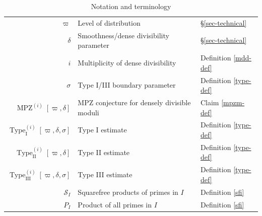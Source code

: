 \documentclass[12pt,a4paper,reqno]{amsart}
\numberwithin{equation}{section}
\DeclareMathOperator*\EH{EH}
\DeclareMathOperator*\MPZ{MPZ}
\DeclareMathOperator*\DHL{DHL}
\theoremstyle{plain}
\theoremstyle{definition}
\newcommand\B{\operatorname{B}}
\newcommand\Scal{\mathcal{S}}
\newcommand\TypeI{\operatorname{Type}_{\operatorname{I}}}
\newcommand\TypeII{\operatorname{Type}_{\operatorname{II}}}
\newcommand\TypeIII{\operatorname{Type}_{\operatorname{III}}}
\begin{document}
\begin{table}[htbp]\caption{Notation and terminology}
\begin{center}
\begin{tabular}{r p{7cm} p{3cm}}
\toprule
$\varpi$ & Level of distribution & \S \ref{sec-technical} \\
$\delta$ & Smoothness/dense divisibility parameter & \S \ref{sec-technical} \\
$i$ & Multiplicity of dense divisibility & Definition \ref{mdd-def}\\
$\sigma$ & Type I/III boundary parameter & Definition \ref{type-def}\\
\midrule
$\MPZ^{(i)}[\varpi,\delta]$ & MPZ conjecture for densely divisible moduli & Claim \ref{mpzm-def} \\
$\TypeI^{(i)}[\varpi,\delta,\sigma]$ & Type I estimate & Definition \ref{type-def} \\
$\TypeII^{(i)}[\varpi,\delta]$ & Type II estimate & Definition \ref{type-def} \\
$\TypeIII^{(i)}[\varpi,\delta,\sigma]$ & Type III estimate & Definition \ref{type-def} \\
\midrule
$\Scal_I$ & Squarefree products of primes in $I$ & Definition \ref{sfi} \\
$P_I$ & Product of all primes in $I$ & Definition \ref{sfi} \\

\end{tabular}
\end{center}
\end{table}
\end{document}
